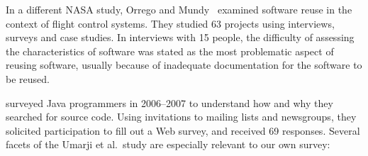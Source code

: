 \documentclass[review]{elsarticle}
\begin{document}
In a different NASA study, Orrego and Mundy~\citep{orrego_2007_study} examined software reuse in the context of flight control systems.  They studied 63 projects using interviews, surveys and case studies.  In interviews with 15 people, the difficulty of assessing the characteristics of software was stated as the most problematic aspect of reusing software, usually because of inadequate documentation for the software to be reused.

\citet{umarji_2008} \citep[also discussed by][]{umarji_2013} surveyed Java programmers in 2006--2007 to understand how and why they searched for source code.  Using invitations to mailing lists and newsgroups, they solicited participation to fill out a Web survey, and received 69 responses.  Several facets of the Umarji et al.\ study are especially relevant to our own survey:
\end{document}
